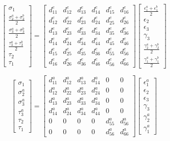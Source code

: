 \documentclass{article}
\begin{document}
\[
\begin{bmatrix}
\sigma_1 \\ \frac{\sigma_2^a+\sigma_2^b}{2} \\ \frac{\sigma_3^a+\sigma_3^b}{2}
\\ \frac{\tau_3^a+\tau_3^b}{2} \\ \tau_2 \\ \tau_1
\end{bmatrix}
=
\begin{bmatrix}
d_{11}^e & d_{12}^e & d_{13}^e & d_{14}^e & d_{15}^e & d_{16}^e \\
d_{12}^e & d_{22}^e & d_{23}^e & d_{24}^e & d_{25}^e & d_{26}^e \\
d_{13}^e & d_{23}^e & d_{33}^e & d_{34}^e & d_{35}^e & d_{36}^e \\
d_{14}^e & d_{24}^e & d_{34}^e & d_{44}^e & d_{45}^e & d_{46}^e \\
d_{15}^e & d_{25}^e & d_{35}^e & d_{36}^e & d_{55}^e & d_{56}^e \\
d_{16}^e & d_{26}^e & d_{36}^e & d_{46}^e & d_{56}^e & d_{66}^e 
\end{bmatrix}
\begin{bmatrix}
\frac{\epsilon_1^a+\epsilon_1^b}{2} \\ \epsilon_2 \\ \epsilon_3 \\ \gamma_3\\ \frac{\gamma_2^a+\gamma_2^b}{2} \\ \frac{\gamma_1^a+\gamma_1^b}{2}
\end{bmatrix}
\]

\[
\begin{bmatrix}
\sigma_1 \\ \sigma_2^a \\ \sigma_3^a \\ \tau_3^a \\ \tau_2 \\ \tau_1
\end{bmatrix}
=
\begin{bmatrix}
d_{11}^a & d_{12}^a & d_{13}^a & d_{14}^a & 0 & 0 \\
d_{12}^a & d_{22}^a & d_{23}^a & d_{24}^a & 0 & 0 \\
d_{13}^a & d_{23}^a & d_{33}^a & d_{34}^a & 0 & 0 \\
d_{14}^a & d_{24}^a & d_{34}^a & d_{44}^a & 0 & 0 \\
0 & 0 & 0 & 0 & d_{55}^a & d_{56}^a \\
0 & 0 & 0 & 0 & d_{56}^a & d_{66}^a 
\end{bmatrix}
\begin{bmatrix}
\epsilon_1^a \\ \epsilon_2 \\ \epsilon_3 \\ \gamma_3\\ \gamma_2^a \\ \gamma_1^a
\end{bmatrix}
\]
\end{document}
